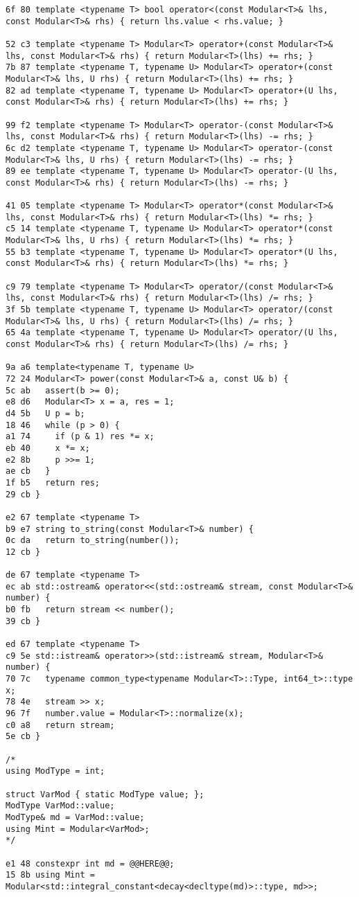 \documentclass[11pt, a4paper, twoside]{article}
\begin{document}
\begin{lstlisting}
6f 80 template <typename T> bool operator<(const Modular<T>& lhs, const Modular<T>& rhs) { return lhs.value < rhs.value; }

52 c3 template <typename T> Modular<T> operator+(const Modular<T>& lhs, const Modular<T>& rhs) { return Modular<T>(lhs) += rhs; }
7b 87 template <typename T, typename U> Modular<T> operator+(const Modular<T>& lhs, U rhs) { return Modular<T>(lhs) += rhs; }
82 ad template <typename T, typename U> Modular<T> operator+(U lhs, const Modular<T>& rhs) { return Modular<T>(lhs) += rhs; }

99 f2 template <typename T> Modular<T> operator-(const Modular<T>& lhs, const Modular<T>& rhs) { return Modular<T>(lhs) -= rhs; }
6c d2 template <typename T, typename U> Modular<T> operator-(const Modular<T>& lhs, U rhs) { return Modular<T>(lhs) -= rhs; }
89 ee template <typename T, typename U> Modular<T> operator-(U lhs, const Modular<T>& rhs) { return Modular<T>(lhs) -= rhs; }

41 05 template <typename T> Modular<T> operator*(const Modular<T>& lhs, const Modular<T>& rhs) { return Modular<T>(lhs) *= rhs; }
c5 14 template <typename T, typename U> Modular<T> operator*(const Modular<T>& lhs, U rhs) { return Modular<T>(lhs) *= rhs; }
55 b3 template <typename T, typename U> Modular<T> operator*(U lhs, const Modular<T>& rhs) { return Modular<T>(lhs) *= rhs; }

c9 79 template <typename T> Modular<T> operator/(const Modular<T>& lhs, const Modular<T>& rhs) { return Modular<T>(lhs) /= rhs; }
3f 5b template <typename T, typename U> Modular<T> operator/(const Modular<T>& lhs, U rhs) { return Modular<T>(lhs) /= rhs; }
65 4a template <typename T, typename U> Modular<T> operator/(U lhs, const Modular<T>& rhs) { return Modular<T>(lhs) /= rhs; }

9a a6 template<typename T, typename U>
72 24 Modular<T> power(const Modular<T>& a, const U& b) {
5c ab   assert(b >= 0);
e8 d6   Modular<T> x = a, res = 1;
d4 5b   U p = b;
18 46   while (p > 0) {
a1 74     if (p & 1) res *= x;
eb 40     x *= x;
e2 8b     p >>= 1;
ae cb   }
1f b5   return res;
29 cb }

e2 67 template <typename T>
b9 e7 string to_string(const Modular<T>& number) {
0c da   return to_string(number());
12 cb }

de 67 template <typename T>
ec ab std::ostream& operator<<(std::ostream& stream, const Modular<T>& number) {
b0 fb   return stream << number();
39 cb }

ed 67 template <typename T>
c9 5e std::istream& operator>>(std::istream& stream, Modular<T>& number) {
70 7c   typename common_type<typename Modular<T>::Type, int64_t>::type x;
78 4e   stream >> x;
96 7f   number.value = Modular<T>::normalize(x);
c0 a8   return stream;
5e cb }

/*
using ModType = int;

struct VarMod { static ModType value; };
ModType VarMod::value;
ModType& md = VarMod::value;
using Mint = Modular<VarMod>;
*/

e1 48 constexpr int md = @@HERE@@;
15 8b using Mint = Modular<std::integral_constant<decay<decltype(md)>::type, md>>;
\end{lstlisting}
\end{document}
